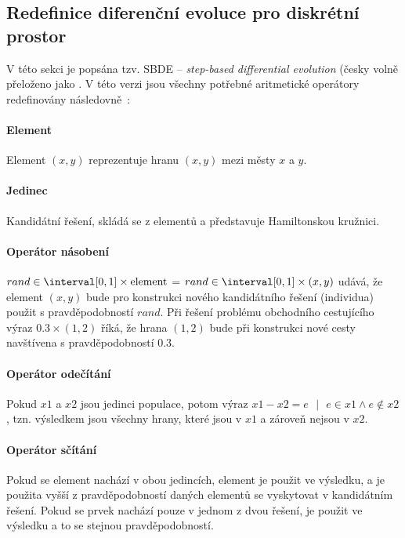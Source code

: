\subsection{Redefinice diferenční evoluce pro diskrétní prostor}
V této sekci je popsána tzv. SBDE -- \emph{step-based differential evolution} (česky volně přeloženo jako . V této verzi jsou všechny potřebné aritmetické operátory redefinovány následovně~\cite{DE_GA_TSP}:

\paragraph{Element}
Element $(x,y)$ reprezentuje hranu $(x,y)$ mezi městy $x$ a $y$.

\paragraph{Jedinec}
Kandidátní řešení, skládá se z elementů a představuje Hamiltonskou kružnici.

\paragraph{Operátor násobení}
$rand \in \interval[{0,1}] \times \text{element}$ = $rand \in \interval[{0,1}] \times (x,y)$ udává, že element $(x,y)$ bude pro konstrukci nového kandidátního řešení (individua) použit s pravděpodobností $rand$. Při řešení problému obchodního cestujícího výraz $0.3 \times (1,2)$ říká, že hrana $(1,2)$ bude při konstrukci nové cesty navštívena s pravděpodobností $0.3$.

\paragraph{Operátor odečítání}
Pokud $x1$ a $x2$ jsou jedinci populace, potom výraz $x1 - x2 = e \text{ } | \text{ } e \in x1 \land e \not\in x2$, tzn. výsledkem jsou všechny hrany, které jsou v $x1$ a zároveň nejsou v $x2$.

\paragraph{Operátor sčítání}
Pokud se element nachází v obou jedincích, element je použit ve výsledku, a je použita vyšší z pravděpodobností daných elementů se vyskytovat v kandidátním řešení. Pokud se prvek nachází pouze v jednom z dvou řešení, je použit ve výsledku a to se stejnou pravděpodobností.

